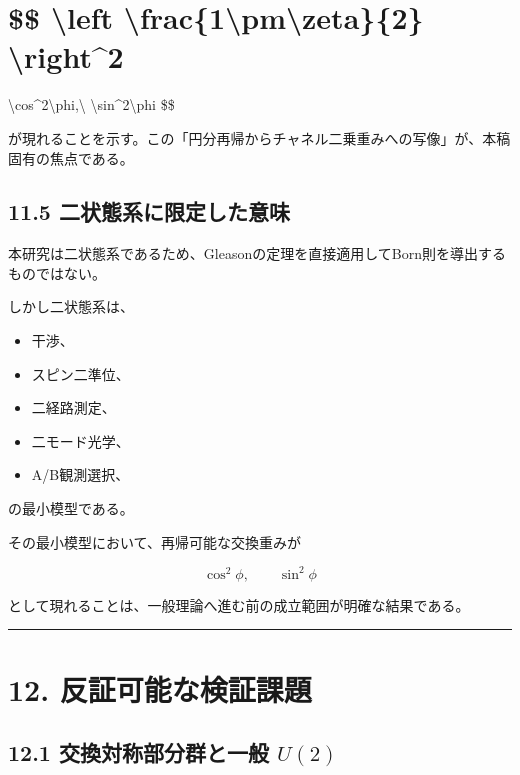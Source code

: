 \documentclass[
  a4paper,
  10pt]{article}
\providecommand{\tightlist}{%
  \setlength{\itemsep}{0pt}\setlength{\parskip}{0pt}}
\begin{document}
\section{\$\$ \textbackslash left\textbar{}
\textbackslash frac\{1\textbackslash pm\textbackslash zeta\}\{2\}
\textbackslash right\textbar\^{}2}\label{-left-frac1pmzeta2-right2}

\textbackslash cos\^{}2\textbackslash phi,\textbackslash{}
\textbackslash sin\^{}2\textbackslash phi \$\$

が現れることを示す。この「円分再帰からチャネル二乗重みへの写像」が、本稿固有の焦点である。

\subsection{11.5
二状態系に限定した意味}\label{115-ux4e8cux72b6ux614bux7cfbux306bux9650ux5b9aux3057ux305fux610fux5473}

本研究は二状態系であるため、Gleasonの定理を直接適用してBorn則を導出するものではない。

しかし二状態系は、

\begin{itemize}
\tightlist
\item
  干渉、
\item
  スピン二準位、
\item
  二経路測定、
\item
  二モード光学、
\item
  A/B観測選択、
\end{itemize}

の最小模型である。

その最小模型において、再帰可能な交換重みが

\[
\cos^2\phi,
\qquad
\sin^2\phi
\]

として現れることは、一般理論へ進む前の成立範囲が明確な結果である。

\begin{center}\rule{0.5\linewidth}{0.5pt}\end{center}

\section{12.
反証可能な検証課題}\label{12-ux53cdux8a3cux53efux80fdux306aux691cux8a3cux8ab2ux984c}

\subsection{\texorpdfstring{12.1 交換対称部分群と一般
\(U(2)\)}{12.1 交換対称部分群と一般 U(2)}}\label{121-ux4ea4ux63dbux5bfeux79f0ux90e8ux5206ux7fa4ux3068ux4e00ux822c-u2}
\end{document}
